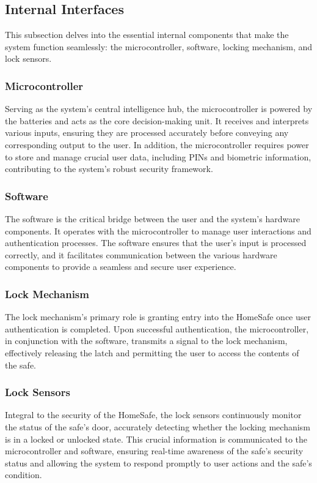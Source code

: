 \documentclass{article}
\begin{document}
\subsection{Internal Interfaces}
This subsection delves into the essential internal components that make the system function seamlessly: the microcontroller, software, locking mechanism, and lock sensors.

\subsubsection{Microcontroller}
Serving as the system's central intelligence hub, the microcontroller is powered by the batteries and acts as the core decision-making unit. It receives and interprets various inputs, ensuring they are processed accurately before conveying any corresponding output to the user. In addition, the microcontroller requires power to store and manage crucial user data, including PINs and biometric information, contributing to the system's robust security framework.

\subsubsection{Software}
The software is the critical bridge between the user and the system's hardware components. It operates with the microcontroller to manage user interactions and authentication processes. The software ensures that the user's input is processed correctly, and it facilitates communication between the various hardware components to provide a seamless and secure user experience.

\subsubsection{Lock Mechanism}
The lock mechanism's primary role is granting entry into the HomeSafe once user authentication is completed. Upon successful authentication, the microcontroller, in conjunction with the software, transmits a signal to the lock mechanism, effectively releasing the latch and permitting the user to access the contents of the safe.

\subsubsection{Lock Sensors}
Integral to the security of the HomeSafe, the lock sensors continuously monitor the status of the safe's door, accurately detecting whether the locking mechanism is in a locked or unlocked state. This crucial information is communicated to the microcontroller and software, ensuring real-time awareness of the safe's security status and allowing the system to respond promptly to user actions and the safe's condition.
\end{document}
